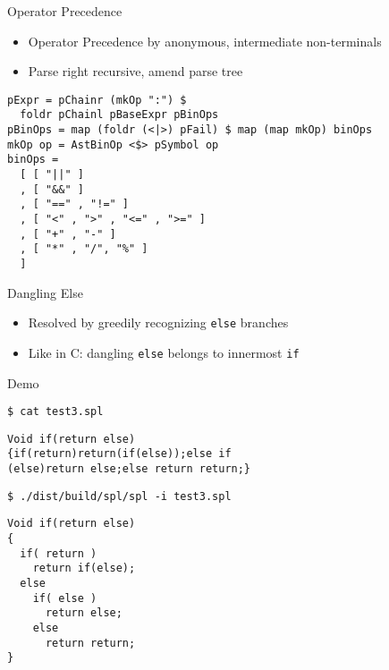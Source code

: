 \documentclass{beamer}
\begin{document}
\begin{frame}[fragile]{Operator Precedence}

\begin{itemize}
  \item Operator Precedence by anonymous, intermediate non-terminals
  \item Parse right recursive, amend parse tree
\end{itemize}

\begin{verbatim}
pExpr = pChainr (mkOp ":") $
  foldr pChainl pBaseExpr pBinOps
pBinOps = map (foldr (<|>) pFail) $ map (map mkOp) binOps
mkOp op = AstBinOp <$> pSymbol op
binOps =
  [ [ "||" ]
  , [ "&&" ]
  , [ "==" , "!=" ]
  , [ "<" , ">" , "<=" , ">=" ]
  , [ "+" , "-" ]
  , [ "*" , "/", "%" ]
  ]
\end{verbatim}

\end{frame}


\begin{frame}{Dangling Else}

\begin{itemize}
  \item Resolved by greedily recognizing \texttt{else} branches
  \item Like in C: dangling \texttt{else} belongs to innermost \texttt{if}
\end{itemize}

\end{frame}


\begin{frame}[fragile]{Demo}
\onslide<+->
\begin{verbatim}
$ cat test3.spl
\end{verbatim}
\onslide<+->
\begin{verbatim}
Void if(return else)
{if(return)return(if(else));else if
(else)return else;else return return;}
\end{verbatim}
\onslide<+->
\begin{verbatim}
$ ./dist/build/spl/spl -i test3.spl
\end{verbatim}
\onslide<+->
\begin{verbatim}
Void if(return else)
{
  if( return )
    return if(else);
  else
    if( else )
      return else;
    else
      return return;
}
\end{verbatim}
\end{frame}
\end{document}
